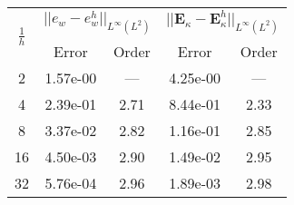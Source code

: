 \begin{table}[hp]
	\centering
	\begin{tabular}{ccccc}
		\hline 
		\multirow{2}{*}{$\frac{1}{h}$} & \multicolumn{2}{c}{$||e_w - e_w^h||_{L^{\infty}(L^2)}$}  & \multicolumn{2}{c}{$||\bm{E}_\kappa - \bm{E}_\kappa^h||_{L^{\infty}(L^2)}$}   \\ 
		& Error & Order  & Error & Order  \\
		\hline 
		2  & 1.57e-00 & ---  & 4.25e-00 & ---  \\ 
		4  & 2.39e-01 & 2.71 & 8.44e-01 & 2.33 \\ 
		8  & 3.37e-02 & 2.82 & 1.16e-01 & 2.85 \\ 
		16 & 4.50e-03 & 2.90 & 1.49e-02 & 2.95 \\ 
		32 & 5.76e-04 & 2.96 & 1.89e-03 & 2.98 \\ 
		\hline 
	\end{tabular} 
	\captionsetup{width=0.95\linewidth}
	\vspace{1mm}
	\label{tab:resminHHJ_CSFS_k3}
\end{table}

